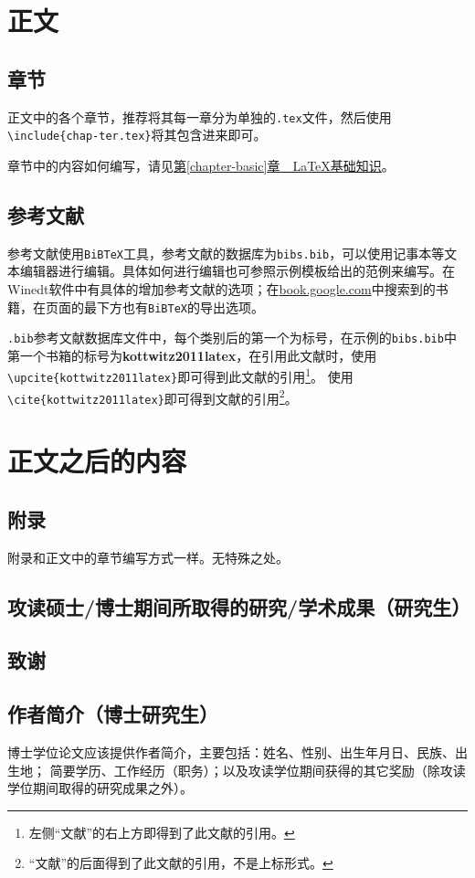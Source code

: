 \section{正文}
\subsection{章节}
正文中的各个章节，推荐将其每一章分为单独的\texttt{.tex}文件，然后使用\texttt{\textbackslash include\{chap\hyp{}ter.tex\}}将其包含进来即可。

章节中的内容如何编写，请见\hyperref[chapter-basic]{第\ref{chapter-basic}章~~\LaTeX{}基础知识}。

\subsection{参考文献}
参考文献使用\texttt{BiBTeX}工具，参考文献的数据库为\texttt{bibs.bib}，可以使用记事本等文本编辑器进行编辑。具体如何进行编辑也可参照示例模板给出的范例来编写。在Winedt软件中有具体的增加参考文献的选项；在\url{book.google.com}中搜索到的书籍，在页面的最下方也有\texttt{BiBTeX}的导出选项。

\texttt{.bib}参考文献数据库文件中，每个类别后的第一个为标号，在示例的\texttt{bibs.bib}中第一个书箱的标号为\textbf{kottwitz2011latex}，在引用此文献时，使用\verb|\upcite{kottwitz2011latex}|即可得到此文献的引用\footnote{左侧“文献”的右上方即得到了此文献的引用。}。
使用\verb|\cite{kottwitz2011latex}|即可得到文献\cite{kottwitz2011latex}的引用\footnote{“文献”的后面得到了此文献的引用，不是上标形式。}。

\section{正文之后的内容}
\subsection{附录}
附录和正文中的章节编写方式一样。无特殊之处。
\subsection{攻读硕士\slash 博士期间所取得的研究\slash 学术成果（研究生）}
\subsection{致谢}
\subsection{作者简介（博士研究生）}
博士学位论文应该提供作者简介，主要包括：姓名、性别、出生年月日、民族、出生地；
简要学历、工作经历（职务）；以及攻读学位期间获得的其它奖励（除攻读学位期间取得的研究成果之外）\cite{bigmem}。
